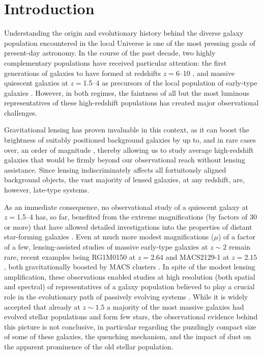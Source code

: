 \documentclass[twocolumn,times]{aastex61}
\begin{document}

\section{Introduction} \label{sec:intro}

Understanding the origin and evolutionary history behind the diverse galaxy population encountered in the local Universe is one of the most pressing goals of present-day astronomy. In the course of the past decade, two highly complementary populations have received particular attention: the first generations of galaxies to have formed at redshifts $z{=}$6--10 \citep[e.g.,][]{ Bunker2010,Yan2011,Bouwens2012,Bouwens2015,Oesch2012}, and massive quiescent galaxies at $z{=}$1.5--4 as  precursors of the local population of early-type galaxies \citep[e.g.,][]{Franx2003,vanDokkum2006, Newman2012,Glazebrook2017}. However, in both regimes, the faintness of all but the most luminous representatives of these high-redshift populations has created major observational challenges. 

Gravitational lensing has proven invaluable in this context, as it can boost the brightness of suitably positioned background galaxies by up to, and in rare cases over, an order of magnitude \citep[e.g.,][]{Yuan2012,Zheng2012,Coe2013, Atek2015,Finkelstein2015,McLeod2015}, thereby allowing us to study average high-redshift galaxies that would be firmly beyond our observational reach without lensing assistance. Since lensing indiscriminately affects all fortuitously aligned background objects, the vast majority of lensed galaxies, at any redshift, are, however, late-type systems.

As an immediate consequence, no observational study of a quiescent galaxy at $z{=}$1.5--4 has, so far, benefited from the extreme magnifications (by factors of 30 or more) that have allowed detailed investigations into the properties of distant star-forming galaxies \citep[e.g.,][]{Smail2007,Swinbank2010}. Even at much more modest magnifications ($\mu$) of a factor of a few, lensing-assisted studies of massive early-type galaxies at $z{\sim}2$ remain rare, recent examples being RG1M0150 at $z=2.64$ \citep[$\mu_{\rm max}=3.9$,][]{Newman2015} and MACS2129-1 at $z=2.15$ \citep[$\mu_{\rm max}=4.6$,][]{Toft2017}, both gravitationally boosted by MACS clusters \citep{Ebeling2001,Ebeling2007,repp2017}. 
 In spite of the modest lensing amplification, these observations enabled studies at high resolution (both spatial and spectral) of representatives of a galaxy population believed to play a crucial role in the evolutionary path of passively evolving systems \citep[e.g.,][]{Toft2012,vandeSande2013,Newman2015}. While it is widely accepted that already at $z{\sim}1.5$ a majority of the most massive galaxies had evolved stellar populations and form few stars, the observational evidence behind this picture is not conclusive, in particular regarding the puzzlingly compact size of some of these galaxies, the quenching mechanism, and the impact of dust on the apparent prominence of the old stellar population. 
\end{document}
